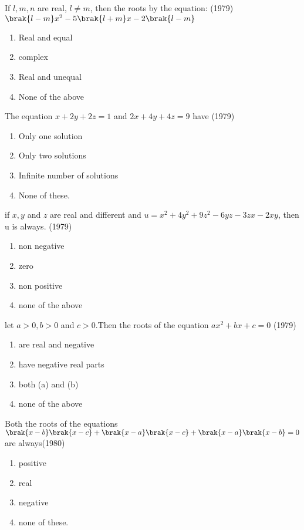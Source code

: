  \iffalse
    \title{Assignment}
    \author{R Sumanth - AI24BTECH11027}
    \section{mcq-single}
  \fi

\item If $l,m,n$ are real, $l\neq m$, then the roots by the equation: 
\hfill (1979)
 $\brak{l-m}x^2-5\brak{l+m}x-2\brak{l-m}$
\begin{enumerate}
\item Real and equal
\item complex
\item Real and unequal
\item None of the above 
\end{enumerate}
\item The equation $x+2y+2z=1$ and $2x+4y+4z=9$ have \hfill (1979)
\begin{enumerate}
\item Only one solution
\item Only two solutions
\item Infinite number of solutions
\item None of these.
\end{enumerate}
\item if $x,y$ and $z$ are real and different and 
$u=x^2+4y^2+9z^2-6yz-3zx-2xy$, then u is always.
\hfill (1979)
\begin{enumerate}
\item non negative
\item zero
\item non positive
\item none of the above
\end{enumerate}
\item let $a>0,b>0$ and $c>0$.Then the roots of  the equation 
$ax^2+bx+c=0$ \hfill (1979)
\begin{enumerate} 
\item are real and negative
\item have negative real parts
\item both (a) and (b)
\item none of the above
\end{enumerate}
\item Both the roots of the equations 
$\brak{x-b}\brak{x-c}+\brak{x-a}\brak{x-c}+\brak{x-a}\brak{x-b} = 0$ are always\hfill (1980)
\begin{enumerate} 
\item positive
\item real
\item negative
\item none of these.
\end{enumerate}
